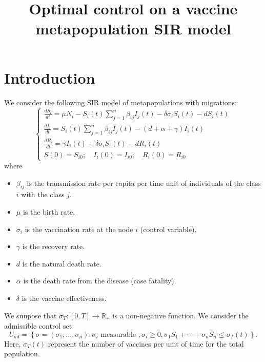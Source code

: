 \documentclass[a4paper,10pt]{article}
\title{Optimal control on a vaccine metapopulation SIR model}
\author{
}
\theoremstyle{remark}
\begin{document}
\maketitle

\begin{abstract}

\end{abstract}


\section{Introduction}




We consider the following SIR model of metapopulations with migrations:
\begin{equation}\label{eq:ModeloSIR}
\left\{\begin{array}{l}\frac{d S_{i}}{d t}=\mu N_{i}-S_{i}(t) \sum_{j=1}^{n} \beta_{i j} I_{j}(t)-\delta \sigma_{i} S_{i}(t)-d S_{i}(t) \\ 
\frac{d I_{i}}{d t}=S_{i}(t) \sum_{j=1}^{n} \beta_{i j} I_{j}(t)-(d+\alpha+\gamma) I_{i}(t) \\ 
\frac{d R_{i}}{d t}=\gamma I_{i}(t)+\delta \sigma_{i} S_{i}(t)-d R_{i}(t)\\
S(0)=S_{i 0};\quad I_{i}(0)=I_{i 0};\quad R_{i}(0)=R_{i 0}
\end{array}\right. 
\end{equation}
where 
\begin{itemize}
\item $\beta_{ij}$ is the transmission rate per capita per time unit of individuals of the class $i$ with the class $j$.
\item $\mu$ is the birth rate. 
\item $\sigma_{i}$ is the vaccination rate at the node $i$ (control variable).
\item $\gamma$ is the recovery rate. 
\item $d$ is the natural death rate. 
\item $\alpha$ is the death rate from the disease (case fatality). 
\item $\delta$ is the vaccine effectiveness.
\end{itemize}

\def\svgwidth{9cm}


We suupose that $\sigma_{T}:[0,T]\to\mathbb{R}_+$ is a non-negative function. We consider the admissible control set
\[U_{ad}=\left\{\sigma=\left(\sigma_{1}, \ldots, \sigma_{n}\right): \sigma_{i}\right.\text{ measurable }, \left.\sigma_{i} \geqslant 0, \sigma_{1}S_{1}+\cdots+\sigma_{n}S_{n}\leq\sigma_{T}(t)\right\}.\]
Here, $\sigma_{T}(t)$ represent the number of vaccines per unit of time for the total population.
\end{document}
